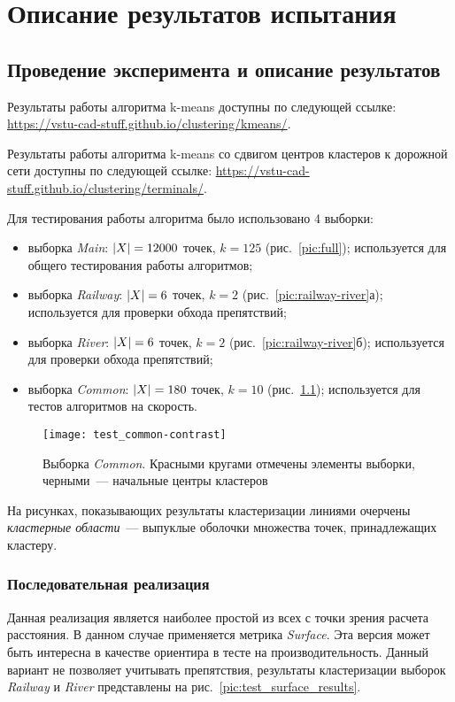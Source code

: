 \chapter{Описание результатов испытания}
\section{Проведение эксперимента и описание результатов}
Результаты работы алгоритма k-means доступны по следующей ссылке:\linebreak
\url{https://vstu-cad-stuff.github.io/clustering/kmeans/}.

Результаты работы алгоритма k-means со сдвигом центров кластеров к дорожной сети доступны по следующей ссылке:\linebreak
\url{https://vstu-cad-stuff.github.io/clustering/terminals/}.

Для тестирования работы алгоритма было использовано 4 выборки:
\begin{itemize}
    \item выборка \emph{Main}: \( \left|X\right| = 12 000 \) точек, \( k = 125 \) (рис.~\ref{pic:full}); используется для общего тестирования работы алгоритмов;
    \item выборка \emph{Railway}: \( \left|X\right| = 6 \) точек, \( k = 2 \) (рис.~\ref{pic:railway-river}а); используется для проверки обхода препятствий;
    \item выборка \emph{River}: \( \left|X\right| = 6 \) точек, \( k = 2 \) (рис.~\ref{pic:railway-river}б); используется для проверки обхода препятствий;
    \item выборка \emph{Common}: \( \left|X\right| = 180 \) точек, \( k = 10 \) (рис.~\ref{pic:common}); используется для тестов алгоритмов на скорость.
\end{itemize}
\begin{figure}[h!]
    \centering
    \texttt{[image: test\_common-contrast]}\\[1ex]
    \parbox{.9\textwidth}{\caption{Выборка \emph{Common}. Красными кругами отмечены элементы выборки, черными~--- начальные центры кластеров}\label{pic:common}}
\end{figure}

На рисунках, показывающих результаты кластеризации линиями очерчены \emph{кластерные области}~--- выпуклые оболочки множества точек, принадлежащих кластеру.

\subsection{Последовательная реализация}
Данная реализация является наиболее простой из всех с точки зрения расчета расстояния. В данном случае применяется метрика \emph{Surface}. Эта версия может быть интересна в качестве ориентира в тесте на производительность. Данный вариант не позволяет учитывать препятствия, результаты кластеризации выборок \emph{Railway} и \emph{River} представлены на рис.~\ref{pic:test_surface_results}.

